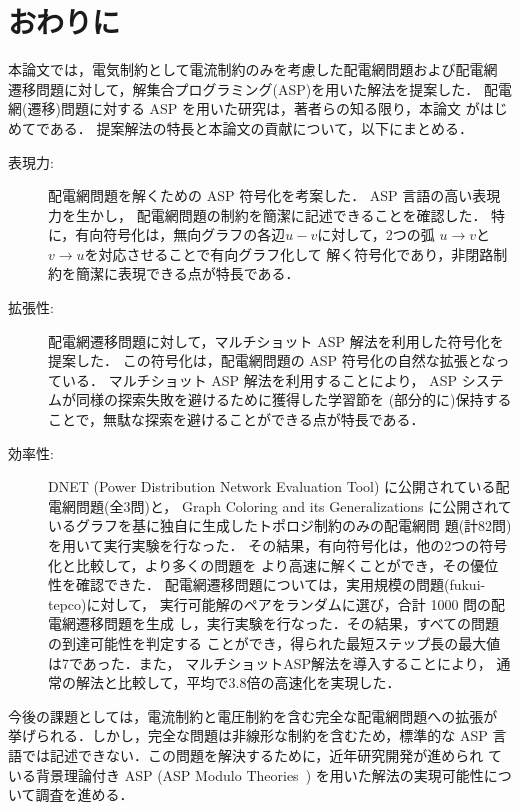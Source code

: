 ﻿\chapter{おわりに}\label{chap:conc}

本論文では，電気制約として電流制約のみを考慮した配電網問題および配電網
遷移問題に対して，解集合プログラミング(ASP)を用いた解法を提案した．
配電網(遷移)問題に対する ASP を用いた研究は，著者らの知る限り，本論文
がはじめてである．
提案解法の特長と本論文の貢献について，以下にまとめる．

\begin{description}
\item[表現力:]
  配電網問題を解くための ASP 符号化を考案した．
  ASP 言語の高い表現力を生かし，
  配電網問題の制約を簡潔に記述できることを確認した．
  特に，有向符号化は，無向グラフの各辺$u-v$に対して，2つの弧
  $u\rightarrow v$と$v\rightarrow u$を対応させることで有向グラフ化して
  解く符号化であり，非閉路制約を簡潔に表現できる点が特長である．
\item[拡張性:]
  配電網遷移問題に対して，マルチショット ASP 解法を利用した符号化を提案した．
  この符号化は，配電網問題の ASP 符号化の自然な拡張となっている．
  マルチショット ASP 解法を利用することにより，
  ASP システムが同様の探索失敗を避けるために獲得した学習節を
  (部分的に)保持することで，無駄な探索を避けることができる点が特長である．
\item[効率性:]
  DNET (Power Distribution Network Evaluation Tool)
  に公開されている配電網問題(全3問)と，
  Graph Coloring and its Generalizations
  に公開されているグラフを基に独自に生成したトポロジ制約のみの配電網問
  題(計82問)を用いて実行実験を行なった．
  その結果，有向符号化は，他の2つの符号化と比較して，より多くの問題を
  より高速に解くことができ，その優位性を確認できた．
  配電網遷移問題については，実用規模の問題({\sf fukui-tepco})に対して，
  実行可能解のペアをランダムに選び，合計 1000 問の配電網遷移問題を生成
  し，実行実験を行なった．その結果，すべての問題の到達可能性を判定する
  ことができ，得られた最短ステップ長の最大値は7であった．また，
  マルチショットASP解法を導入することにより，
  通常の解法と比較して，平均で3.8倍の高速化を実現した．
\end{description}

今後の課題としては，電流制約と電圧制約を含む完全な配電網問題への拡張が
挙げられる．しかし，完全な問題は非線形な制約を含むため，標準的な ASP
言語では記述できない．この問題を解決するために，近年研究開発が進められ
ている背景理論付き ASP (ASP Modulo Theories~\cite{DBLP:conf/iclp/GebserKKOSW16}) 
を用いた解法の実現可能性について調査を進める．

